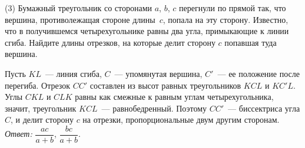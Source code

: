 \textsf{(3)}
Бумажный треугольник со сторонами $a$, $b$, $c$ перегнули по прямой так,
что вершина, противолежащая стороне длины~$c$, попала на эту сторону.
Известно, что в получившемся четырехугольнике равны два угла,
примыкающие к линии сгиба.
Найдите длины отрезков, на которые делит сторону $c$ попавшая туда вершина.

\solution
Пусть $KL$~--- линия сгиба, $C$~--- упомянутая вершина, $C'$~--- ее
положение после перегиба.
Отрезок $CC'$ составлен из высот равных треугольников $KCL$ и $KC'L$.
Углы $CKL$ и $CLK$ равны как смежные к равным углам четырехугольника, значит,
треугольник $KCL$~--- равнобедренный.
Поэтому $CC'$~--- биссектриса угла $C$, и делит сторону $c$ на отрезки,
пропорциональные двум другим сторонам.
\emph{Ответ:} $\dfrac{a c}{a + b}$, $\dfrac{b c}{a + b}$.

